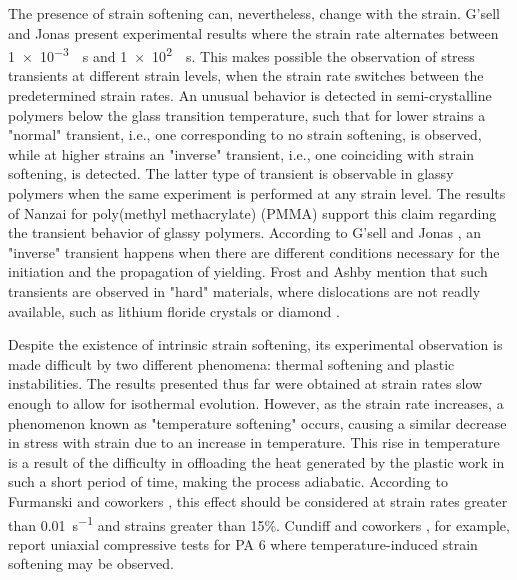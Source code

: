 The presence of strain softening can, nevertheless, change with the strain.
G'sell and Jonas \citep{gsellYieldTransientEffects1981} present experimental results where the strain rate alternates between \SI{1e-3}{\per\second} and \SI{1e2}{\per \second}.
This makes possible the observation of stress transients at different strain levels, when the strain rate switches between the predetermined strain rates.
An unusual behavior is detected in semi-crystalline polymers below the glass transition temperature, such that for lower strains a "normal" transient, i.e., one corresponding to no strain softening, is observed, while at higher strains an "inverse" transient, i.e., one coinciding with strain softening, is detected.
The latter type of transient is observable in glassy polymers when the same experiment is performed at any strain level.
The results of Nanzai \citep{nanzaiTransitionMechanismElastic1990} for poly(methyl methacrylate) (PMMA) support this claim regarding the transient behavior of glassy polymers.
According to G'sell and Jonas \citep{gsellDeterminationPlasticBehaviour1979}, an "inverse" transient happens when there are different conditions necessary for the initiation and the propagation of yielding.
Frost and Ashby \citep{frostDeformationmechanismMapsPlasticity1982} mention that such transients are observed in "hard" materials, where dislocations are not readly available, such as lithium floride crystals \citep{gilmanDislocationSourcesCrystals1959, johnstonYieldPointsDelay1962} or diamond \citep{alexanderDislocationsPlasticFlow1969}.

Despite the existence of intrinsic strain softening, its experimental observation is made difficult by two different phenomena: thermal softening and plastic instabilities.
The results presented thus far were obtained at strain rates slow enough to allow for isothermal evolution.
However, as the strain rate increases, a phenomenon known as "temperature softening" occurs, causing a similar decrease in stress with strain due to an increase in temperature.
This rise in temperature is a result of the difficulty in offloading the heat generated by the plastic work in such a short period of time, making the process adiabatic.
According to Furmanski and coworkers \citep{furmanskiTimeTemperatureEquivalence2013}, this effect should be considered at strain rates greater than \SI{0.01}{s^{-1}} and strains greater than 15\%.
Cundiff and coworkers \citep{cundiffModelingViscoplasticBehavior2022}, for example, report uniaxial compressive tests for PA 6 where temperature-induced strain softening may be observed.

